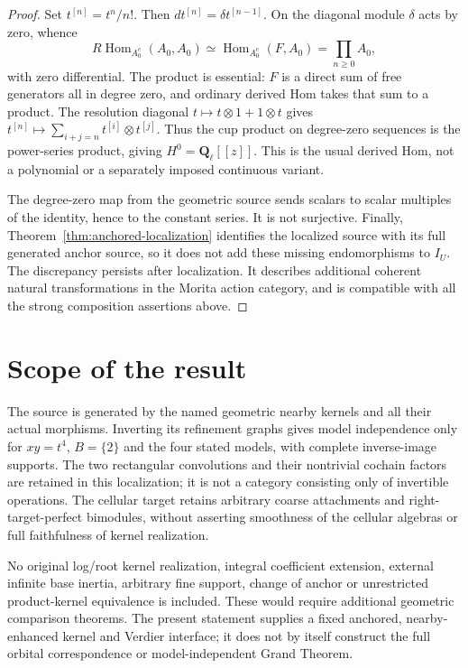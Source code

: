 \documentclass[11pt]{article}
\theoremstyle{definition}
\theoremstyle{remark}
\newcommand{\Q}{\mathbf Q_\ell}
\newcommand{\RHom}{R\operatorname{Hom}}
\begin{document}
\begin{proof}
Set $t^{[n]}=t^n/n!$.  Then $dt^{[n]}=\delta t^{[n-1]}$.
On the diagonal module $\delta$ acts by zero, whence
\[
 \RHom_{A_0^e}(A_0,A_0)
   \simeq\operatorname{Hom}_{A_0^e}(F,A_0)
   =\prod_{n\geq0} A_0,
\]
with zero differential.  The product is essential: $F$ is a direct
sum of free generators all in degree zero, and ordinary derived
Hom takes that sum to a product.  The resolution diagonal
$t\mapsto t\otimes1+1\otimes t$ gives
$t^{[n]}\mapsto\sum_{i+j=n}t^{[i]}\otimes t^{[j]}$.
Thus the cup product on degree-zero sequences is the power-series
product, giving $H^0=\Q[[z]]$.  This is the usual derived Hom,
not a polynomial or a separately imposed continuous variant.

The degree-zero map from the geometric source sends scalars to
scalar multiples of the identity, hence to the constant series.
It is not surjective.  Finally,
Theorem~\ref{thm:anchored-localization} identifies the localized
source with its full generated anchor source, so it does not add
these missing endomorphisms to $I_U$.  The discrepancy persists
after localization.  It describes additional coherent natural
transformations in the Morita action category, and is compatible
with all the strong composition assertions above.
\end{proof}

\section{Scope of the result}
The source is generated by the named geometric nearby kernels and
all their actual morphisms.  Inverting its refinement graphs gives
model independence only for $xy=t^4$, $B=\{2\}$ and the four stated
models, with complete inverse-image supports.  The two rectangular
convolutions and their nontrivial cochain factors are retained in
this localization; it is not a category consisting only of invertible
operations.  The cellular target retains arbitrary coarse attachments
and right-target-perfect bimodules, without asserting smoothness of
the cellular algebras or full faithfulness of kernel realization.

No original log/root kernel realization, integral coefficient extension,
external infinite base inertia, arbitrary fine support, change of anchor
or unrestricted product-kernel equivalence is included.  These would
require additional geometric comparison theorems.  The present statement
supplies a fixed anchored, nearby-enhanced kernel and Verdier interface;
it does not by itself construct the full orbital correspondence or
model-independent Grand Theorem.
\end{document}
